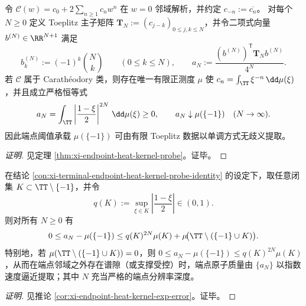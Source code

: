 \begin{conclusion}\label{con:xi-terminal-endpoint-heat-kernel-probe-identity}
令 \(\mathscr{C}(w)=c_0+2\sum_{n\ge 1}c_n w^n\) 在 \(w=0\) 邻域解析，并约定 \(c_{-n}:=\overline{c_n}\)。
对每个 \(N\ge 0\) 定义 Toeplitz 主子矩阵 \(\mathbf{T}_N:=(c_{j-k})_{0\le j,k\le N}\)，并令二项式向量 \(b^{(N)}\in\RR^{N+1}\) 满足
\[
b^{(N)}_k:=(-1)^k\binom{N}{k}\qquad(0\le k\le N),
\qquad
a_N:=\frac{(b^{(N)})^{\mathsf T}\mathbf{T}_N b^{(N)}}{4^N}.
\]
若 \(\mathscr{C}\) 属于 Carath\'eodory 类，则存在唯一有限正测度 \(\mu\) 使 \(c_n=\int_{\TT}\xi^{-n}\,\dd\mu(\xi)\)，并且成立严格恒等式
\[
a_N=\int_{\TT}\left|\frac{1-\xi}{2}\right|^{2N}\,\dd\mu(\xi)\ge 0,
\qquad
a_N\downarrow \mu(\{-1\})\quad(N\to\infty).
\]
因此端点阈值承载 \(\mu(\{-1\})\) 可由有限 Toeplitz 数据以单调方式无歧义提取。
\end{conclusion}
\begin{proof}[证明]
见定理 \ref{thm:xi-endpoint-heat-kernel-probe}。证毕。
\end{proof}

\begin{conclusion}\label{con:xi-terminal-endpoint-atom-exponential-error}
在结论 \ref{con:xi-terminal-endpoint-heat-kernel-probe-identity} 的设定下，取任意闭集 \(K\subset\TT\setminus\{-1\}\)，并令
\[
q(K):=\sup_{\xi\in K}\left|\frac{1-\xi}{2}\right|\in(0,1).
\]
则对所有 \(N\ge 0\) 有
\[
0\le a_N-\mu(\{-1\})\le q(K)^{2N}\mu(K)+\mu\!\bigl(\TT\setminus(\{-1\}\cup K)\bigr).
\]
特别地，若 \(\mu(\TT\setminus(\{-1\}\cup K))=0\)，则
\(
0\le a_N-\mu(\{-1\})\le q(K)^{2N}\mu(K)
\)，从而在端点邻域之外存在谱隙（或支撑受控）时，端点原子质量由 \(\{a_N\}\) 以指数速度逼近提取；其中 \(N\) 充当严格的端点分辨率深度。
\end{conclusion}
\begin{proof}[证明]
见推论 \ref{cor:xi-endpoint-heat-kernel-exp-error}。证毕。
\end{proof}

